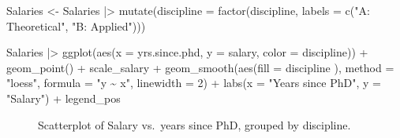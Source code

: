 \documentclass[
  letterpaper,
  10pt,
  krantz2]{krantz}
\makeatletter
\newenvironment{Shaded}{\begin{snugshade}}{\end{snugshade}}
\newcommand{\AttributeTok}[1]{\textcolor[rgb]{0.40,0.45,0.13}{#1}}
\newcommand{\DecValTok}[1]{\textcolor[rgb]{0.68,0.00,0.00}{#1}}
\newcommand{\FunctionTok}[1]{\textcolor[rgb]{0.28,0.35,0.67}{#1}}
\newcommand{\NormalTok}[1]{\textcolor[rgb]{0.00,0.23,0.31}{#1}}
\newcommand{\OtherTok}[1]{\textcolor[rgb]{0.00,0.23,0.31}{#1}}
\newcommand{\SpecialCharTok}[1]{\textcolor[rgb]{0.37,0.37,0.37}{#1}}
\newcommand{\StringTok}[1]{\textcolor[rgb]{0.13,0.47,0.30}{#1}}
\newenvironment{kframe}{%
  \medskip{}
  \setlength{\fboxsep}{.8em}
  \def\at@end@of@kframe{}%
  \ifinner\ifhmode%
  \def\at@end@of@kframe{\end{minipage}}%
  \begin{minipage}{\columnwidth}%
  \fi\fi%
  \def\FrameCommand##1{\hskip\@totalleftmargin \hskip-\fboxsep
  \colorbox{shadecolor}{##1}\hskip-\fboxsep
      \hskip-\linewidth \hskip-\@totalleftmargin \hskip\columnwidth}%
  \MakeFramed {\advance\hsize-\width
    \@totalleftmargin\z@ \linewidth\hsize
    \@setminipage}}%
{\par\unskip\endMakeFramed%
  \at@end@of@kframe}
\renewenvironment{Shaded}{\begin{kframe}}{\end{kframe}}
\makeatother
\begin{document}
\begin{Shaded}
\begin{Highlighting}[]
\NormalTok{Salaries }\OtherTok{\textless{}{-}}\NormalTok{ Salaries }\SpecialCharTok{|\textgreater{}}
  \FunctionTok{mutate}\NormalTok{(}\AttributeTok{discipline =} 
           \FunctionTok{factor}\NormalTok{(discipline, }
                  \AttributeTok{labels =} \FunctionTok{c}\NormalTok{(}\StringTok{"A: Theoretical"}\NormalTok{, }\StringTok{"B: Applied"}\NormalTok{)))}

\NormalTok{Salaries }\SpecialCharTok{|\textgreater{}}
  \FunctionTok{ggplot}\NormalTok{(}\FunctionTok{aes}\NormalTok{(}\AttributeTok{x =}\NormalTok{ yrs.since.phd, }\AttributeTok{y =}\NormalTok{ salary, }\AttributeTok{color =}\NormalTok{ discipline)) }\SpecialCharTok{+}
    \FunctionTok{geom\_point}\NormalTok{() }\SpecialCharTok{+}
\NormalTok{  scale\_salary }\SpecialCharTok{+}
  \FunctionTok{geom\_smooth}\NormalTok{(}\FunctionTok{aes}\NormalTok{(}\AttributeTok{fill =}\NormalTok{ discipline ),}
                \AttributeTok{method =} \StringTok{"loess"}\NormalTok{, }\AttributeTok{formula =} \StringTok{"y \textasciitilde{} x"}\NormalTok{, }
                \AttributeTok{linewidth =} \DecValTok{2}\NormalTok{) }\SpecialCharTok{+} 
  \FunctionTok{labs}\NormalTok{(}\AttributeTok{x =} \StringTok{"Years since PhD"}\NormalTok{,}
       \AttributeTok{y =} \StringTok{"Salary"}\NormalTok{) }\SpecialCharTok{+}
\NormalTok{  legend\_pos }
\end{Highlighting}
\end{Shaded}

\begin{figure}[H]


\caption{\label{fig-Salaries-discipline}Scatterplot of Salary vs.~years
since PhD, grouped by discipline.}

\end{figure}%
\end{document}
